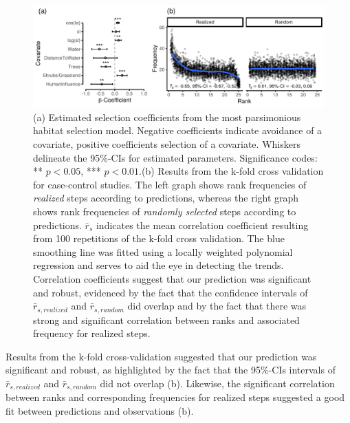 \documentclass[abstract=on,10pt,a4paper,bibliography=totocnumbered]{article}
\begin{document}
\begin{figure}[h]
  \begin{center}
    \includegraphics[width = \textwidth]{99_PermeabilityResults.pdf}
    \caption{(a) Estimated selection coefficients from the most parsimonious
    habitat selection model. Negative coefficients indicate avoidance of a
    covariate, positive coefficients selection of a covariate. Whiskers
    delineate the 95\%-CIs for estimated parameters. Significance codes: ** \(p
    < 0.05\), *** \(p < 0.01\).(b) Results from the k-fold cross validation for
    case-control studies. The left graph shows rank frequencies of
    \textit{realized} steps according to predictions, whereas the right graph
    shows rank frequencies of \textit{randomly selected} steps according to
    predictions. \(\bar{r}_s\) indicates the mean correlation coefficient
    resulting from 100 repetitions of the k-fold cross validation. The blue
    smoothing line was fitted using a locally weighted polynomial regression and
    serves to aid the eye in detecting the trends. Correlation coefficients
    suggest that our prediction was significant and robust, evidenced by the
    fact that the confidence intervals of \(\bar{r}_{s, realized}\) and
    \(\bar{r}_{s, random}\) did overlap and by the fact that there was strong
    and significant correlation between ranks and associated frequency for
    realized steps.}
    \label{PermeabilityResults}
  \end{center}
\end{figure}

Results from the k-fold cross-validation suggested that our prediction was
significant and robust, as highlighted by the fact that the 95\%-CIs intervals
of \(\bar{r}_{s, realized}\) and \(\bar{r}_{s, random}\) did not overlap
(b). Likewise, the significant correlation between
ranks and corresponding frequencies for realized steps suggested a good fit
between predictions and observations (b).
\end{document}

